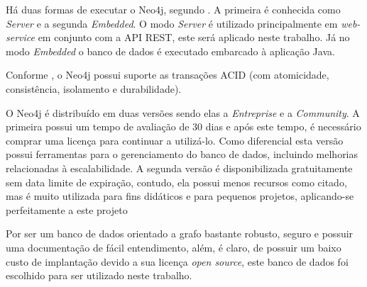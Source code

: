 \par Há duas formas de executar o Neo4j, segundo . A primeira é conhecida como \textit{Server} e a segunda \textit{Embedded}. O modo \textit{Server} é utilizado principalmente em \textit{web-service} em conjunto com a API REST, este será aplicado neste trabalho. Já no modo \textit{Embedded} o banco de dados é executado embarcado à aplicação Java.

\par Conforme , o Neo4j possui suporte as transações ACID (com atomicidade, consistência, isolamento e durabilidade).

O Neo4j é distribuído em duas versões sendo elas a \textit{Entreprise} e a \textit{Community}. A primeira possui um tempo de avaliação de 30 dias e após este tempo, é necessário comprar uma licença para continuar a utilizá-lo. Como diferencial esta versão possui ferramentas para o gerenciamento do banco de dados, incluindo melhorias relacionadas à escalabilidade. A segunda versão é disponibilizada gratuitamente sem data limite de expiração, contudo, ela possui menos recursos como citado, mas é muito utilizada para fins didáticos e para pequenos projetos, aplicando-se perfeitamente a este projeto \cite{neo4j_team_manual}

\par Por ser um banco de dados orientado a grafo bastante robusto, seguro e possuir uma documentação de fácil entendimento, além, é claro, de possuir um baixo custo de implantação devido a sua licença \textit{open source}, este banco de dados foi escolhido para ser utilizado neste trabalho.
